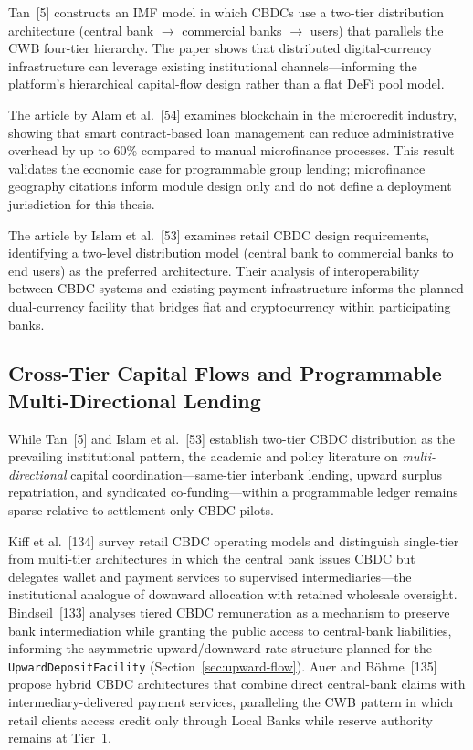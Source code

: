 \documentclass[12pt,a4paper]{report}
\begin{document}
Tan~[5] constructs an IMF model in which CBDCs use a two-tier distribution architecture (central bank $\to$ commercial banks $\to$ users) that parallels the CWB four-tier hierarchy. The paper shows that distributed digital-currency infrastructure can leverage existing institutional channels---informing the platform's hierarchical capital-flow design rather than a flat DeFi pool model.

The article by Alam et al.~[54] examines blockchain in the microcredit industry, showing that smart contract-based loan management can reduce administrative overhead by up to 60\% compared to manual microfinance processes. This result validates the economic case for programmable group lending; microfinance geography citations inform module design only and do not define a deployment jurisdiction for this thesis.

The article by Islam et al.~[53] examines retail CBDC design requirements, identifying a two-level distribution model (central bank to commercial banks to end users) as the preferred architecture. Their analysis of interoperability between CBDC systems and existing payment infrastructure informs the planned dual-currency facility that bridges fiat and cryptocurrency within participating banks.

\subsection{Cross-Tier Capital Flows and Programmable Multi-Directional Lending}
\label{sec:lit-cross-tier}

While Tan~[5] and Islam et al.~[53] establish two-tier CBDC distribution as the prevailing institutional pattern, the academic and policy literature on \emph{multi-directional} capital coordination---same-tier interbank lending, upward surplus repatriation, and syndicated co-funding---within a programmable ledger remains sparse relative to settlement-only CBDC pilots.

Kiff et al.~[134] survey retail CBDC operating models and distinguish single-tier from multi-tier architectures in which the central bank issues CBDC but delegates wallet and payment services to supervised intermediaries---the institutional analogue of downward allocation with retained wholesale oversight. Bindseil~[133] analyses tiered CBDC remuneration as a mechanism to preserve bank intermediation while granting the public access to central-bank liabilities, informing the asymmetric upward/downward rate structure planned for the \texttt{UpwardDepositFacility} (Section~\ref{sec:upward-flow}). Auer and B\"{o}hme~[135] propose hybrid CBDC architectures that combine direct central-bank claims with intermediary-delivered payment services, paralleling the CWB pattern in which retail clients access credit only through Local Banks while reserve authority remains at Tier~1.
\end{document}
